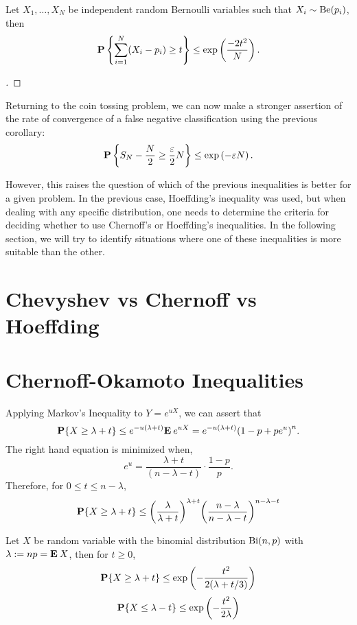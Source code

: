 \begin{corollary}
  Let $X_1,\ldots, X_N$ be independent random Bernoulli variables such that $X_i \sim \Be(p_i)$, then
  \[ \P\left\{ \sum_{i = 1}^N (X_i - p_i) \geq t\right\} \leq \exp\left( \frac{-2t^2}{N}\right). \] 
\end{corollary}

\begin{proof}[]

\end{proof}

Returning to the coin tossing problem, we can now make a stronger assertion of the rate of convergence of a false negative classification using the previous corollary:
\[\P \left\{S_N- \frac{N}{2} \geq \frac{\varepsilon}{2} N \right\} \leq \exp\left( - \varepsilon N \right). \] 

However, this raises the question of which of the previous inequalities is better for a given problem. In the previous case, Hoeffding's inequality was used, but when dealing with any specific distribution, one needs to determine the criteria for deciding whether to use Chernoff's or Hoeffding's inequalities. In the following section, we will try to identify situations where one of these inequalities is more suitable than the other.

\section{Chevyshev vs Chernoff vs Hoeffding}

\section{Chernoff-Okamoto Inequalities}

Applying Markov's Inequality to $Y = e^{uX}$, we can assert that
  \[
    \P\{X \geq \lambda + t\} \leq e^{-u(\lambda+t)} \E e^{uX} = e^{-u(\lambda+ t)} {(1-p + p e^{u})}^n. 
  \] 
  The right hand equation is minimized when,
  \[ e^{u} = \frac{\lambda+t}{(n-\lambda-t)} \cdot \frac{1-p}{p}. \]
  Therefore, for $0 \leq t \leq n-\lambda$,
  \begin{equation}\label{co:1}
    \P\{X \geq \lambda + t\} \leq {\left(\frac{\lambda}{\lambda+t}\right)}^{\lambda + t} {\left(\frac{n-\lambda}{n-\lambda-t}\right)}^{n - \lambda - t}
  \end{equation}

\begin{theorem}\label{co:T1}
  Let $X$ be random variable with the binomial distribution $\Bi(n,p)$ with $\lambda := np = \E X$, then for $t \geq 0$,
  \begin{equation}\label{co:2}
    \P\{X \geq \lambda + t\} \leq \exp\left(- \frac{t^2}{2(\lambda+t/3)}\right)
  \end{equation}
  \begin{equation}\label{co:3}
    \P\{X \leq \lambda - t\} \leq \exp\left(- \frac{t^2}{2\lambda}\right)
  \end{equation}
\end{theorem}

